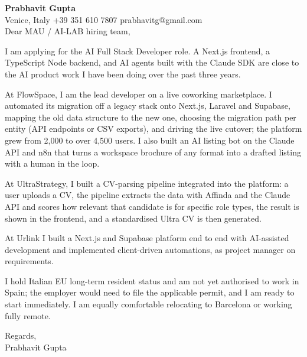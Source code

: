\documentclass[a4paper,10.5pt]{article}
\begin{document}
\textbf{Prabhavit Gupta}\\
Venice, Italy \textbar{} +39 351 610 7807 \textbar{} prabhavitg@gmail.com\\[10pt]
Dear MAU / AI-LAB hiring team,

I am applying for the AI Full Stack Developer role. A Next.js frontend, a TypeScript Node backend, and AI agents built with the Claude SDK are close to the AI product work I have been doing over the past three years.

At FlowSpace, I am the lead developer on a live coworking marketplace. I automated its migration off a legacy stack onto Next.js, Laravel and Supabase, mapping the old data structure to the new one, choosing the migration path per entity (API endpoints or CSV exports), and driving the live cutover; the platform grew from 2,000 to over 4,500 users. I also built an AI listing bot on the Claude API and n8n that turns a workspace brochure of any format into a drafted listing with a human in the loop.

At UltraStrategy, I built a CV-parsing pipeline integrated into the platform: a user uploads a CV, the pipeline extracts the data with Affinda and the Claude API and scores how relevant that candidate is for specific role types, the result is shown in the frontend, and a standardised Ultra CV is then generated.

At Urlink I built a Next.js and Supabase platform end to end with AI-assisted development and implemented client-driven automations, as project manager on requirements.

I hold Italian EU long-term resident status and am not yet authorised to work in Spain; the employer would need to file the applicable permit, and I am ready to start immediately. I am equally comfortable relocating to Barcelona or working fully remote.

Regards,\\
Prabhavit Gupta
\end{document}
